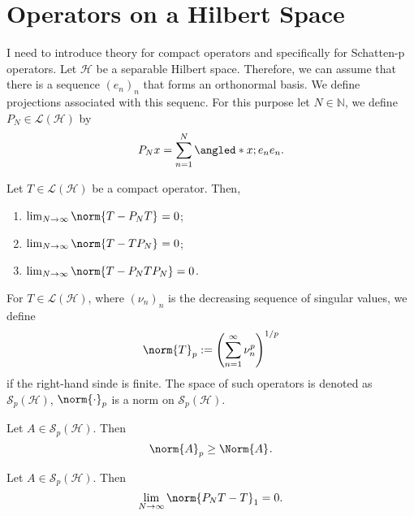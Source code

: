 \newpage

\section{Operators on a Hilbert Space}
 I need to introduce theory for compact operators and specifically for Schatten-p operators. 
Let \( \mathcal{H} \) be a separable Hilbert space. Therefore, we can assume that there is a sequence \( (e_n)_n \) that forms an orthonormal basis. We define projections associated with this sequenc. For this purpose let \( N\in \mathbb{N} \), we define \( P_N \in \mathcal{L}(\mathcal{H}) \) by 
\[ P_Nx = \sum_{n=1}^{N} \angled*{x;e_n}e_n. \]



\begin{thm}[]
    Let \( T\in \mathcal{L}(\mathcal{H})   \) be a compact operator.
    Then,
    \begin{enumerate}[1)]
      \item \( \lim_{N \to \infty} \norm{T-P_NT}_{}=0 \);
      \item \( \lim_{N \to \infty} \norm{T-TP_N}_{}=0 \);
      \item \( \lim_{N \to \infty} \norm{T-P_NTP_N}=0 \).
    \end{enumerate}
    
\end{thm}


\begin{thm}
    
\end{thm}


\begin{defn}
    For \( T \in \mathcal{L}(\mathcal{H}) \), where \( (\nu_n)_n \) is the decreasing sequence of singular values, we define 
    \[ \norm{T}_{p} := \left(\sum_{n=1}^{\infty} \nu_n^{p}\right)^{1/p} \]
    if the right-hand sinde is finite. The space of such operators is denoted as \( \mathcal{S}_p(\mathcal{H}) \), \( \norm{\cdot}_{p} \) is a norm on \( \mathcal{S}_p(\mathcal{H}) \).
\end{defn}


\begin{lem}[]
    Let \( A \in \mathcal{S}_{p}\left(\mathcal{H}\right) \). Then
    \[ \norm{A}_{p} \geq \Norm{A}_{}. \]
\end{lem}


\begin{thm}[]
    Let \( A \in \mathcal{S}_p(\mathcal{H}) \). Then
    \[ \lim_{N \to \infty} \norm{P_NT-T}_{1}=0 .\]
\end{thm}

